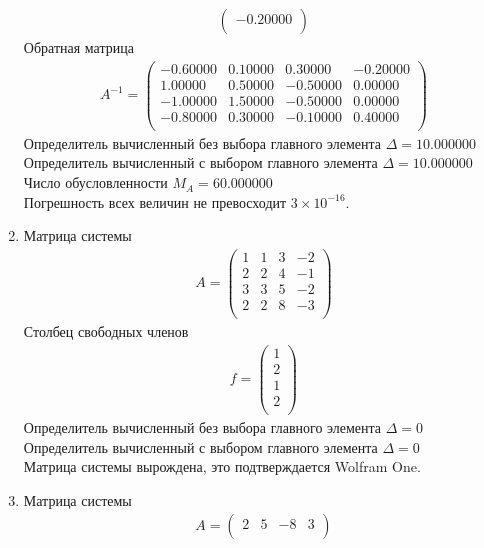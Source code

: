 \documentclass[a4paper,12pt,titlepage,finall]{article}
\begin{document}
\begin{enumerate}
\begin{align*}
\begin{pmatrix}
  -0.20000 \\
\end{pmatrix}
\end{align*}
Обратная матрица
\begin{align*}
A^{-1} = \begin{pmatrix}
-0.60000&     0.10000&     0.30000&    -0.20000 \\
   1.00000&     0.50000&    -0.50000&     0.00000 \\
  -1.00000&     1.50000&    -0.50000&     0.00000 \\
  -0.80000&     0.30000&    -0.10000&     0.40000 \\
\end{pmatrix}
\end{align*}
Определитель вычисленный без выбора главного элемента  $\Delta = 10.000000$\\
Определитель вычисленный с выбором главного элемента $\Delta = 10.000000$\\
Число обусловленности $M_A = 60.000000$\\
Погрешность всех величин не превосходит $3 \times 10^{-16}$.
\item
Матрица системы
\begin{align*}
A = \begin{pmatrix}
1&     1&     3&    -2 \\
   2&     2&     4&    -1 \\
   3&     3&     5&    -2 \\
   2&     2&     8&    -3 \\
\end{pmatrix}
\end{align*}
Столбец свободных членов
\begin{align*}
f = \begin{pmatrix}
1 \\
2 \\
1 \\
2 \\
\end{pmatrix}
\end{align*}
Определитель вычисленный без выбора главного элемента  $\Delta = 0$\\
Определитель вычисленный с выбором главного элемента $\Delta = 0$\\
Матрица системы вырождена, это подтверждается Wolfram One.
\item
Матрица системы
\begin{align*}
A = \begin{pmatrix}
2&           5&          -8&           3 \\

\end{pmatrix}
\end{align*}
\end{enumerate}
\end{document}
